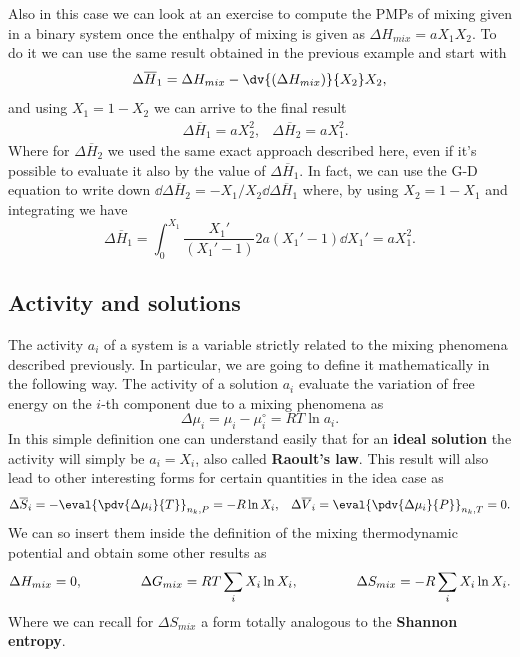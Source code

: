 \ex{}
{
    Also in this case we can look at an exercise to compute the PMPs of mixing given in a binary system once the enthalpy of mixing is given as $\Delta H_{mix} = a X_1X_2$. To do it we can use the same result obtained in the previous example and start with
    \begin{equation}
        \Delta \overline{H}_1 = \Delta H_{mix} - \dv{(\Delta H_{mix})}{X_2} X_2,
    \end{equation}
    and using $X_1 = 1 - X_2$ we can arrive to the final result
    \begin{align}
        &\Delta \overline{H}_1 = a X_2^2, & \Delta \overline{H}_2 = a X_1^2.
    \end{align}
    Where for $\Delta \overline{H}_2$ we used the same exact approach described here, even if it's possible to evaluate it also by the value of $\Delta \overline{H}_1$. In fact, we can use the G-D equation to write down $\dd \Delta \overline{H}_2 = - X_1/X_2 \dd \Delta \overline{H}_1$ where, by using $X_2 = 1 - X_1$ and integrating we have
    \begin{equation}
        \Delta \overline{H}_1 = \int_0^{X_1} \frac{X_1'}{(X_1' - 1)} 2a(X_1' - 1) \dd X_1' = a X_1^2.
    \end{equation}
}

\subsection{Activity and solutions}

The activity $a_i$ of a system is a variable strictly related to the mixing phenomena described previously. In particular, we are going to define it mathematically in the following way.
{
    The activity of a solution $a_i$ evaluate the variation of free energy on the $i$-th component due to a mixing phenomena as
    \begin{equation}
        \label{eq:defActivity}
        \Delta\mu_i = \mu_i - \mu_i^\circ = RT\ln a_i.
    \end{equation}
}
\noindent
In this simple definition one can understand easily that for an \textbf{ideal solution} the activity will simply be $a_i = X_i$, also called \textbf{Raoult's law}. This result will also lead to other interesting forms for certain quantities in the idea case as
\begin{align}
    &\Delta \overline{S}_i = - \eval{\pdv{\Delta\mu_i}{T}}_{n_k, P} = -R\ln X_i, &\Delta \overline{V}_i = \eval{\pdv{\Delta\mu_i}{P}}_{n_k, T} = 0.
\end{align}
We can so insert them inside the definition of the mixing thermodynamic potential and obtain some other results as
\begin{equation}
    \Delta H_{mix} = 0, \hspace{1.5cm}\Delta G_{mix} = RT\sum_i X_i\ln X_i, \hspace{1.5cm} \Delta S_{mix} = -R\sum_i X_i\ln X_i.
\end{equation}
Where we can recall for $\Delta S_{mix}$ a form totally analogous to the \textbf{Shannon entropy}.

